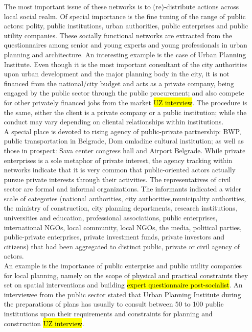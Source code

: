 \documentclass[11pt]{report}
\begin{document}
The most important issue of these networks is to (re)-distribute actions across local social realm. Of special importance is the fine tuning of the range of public actors: polity, public institutions, urban authorities, public enterprises and public utility companies.
These socially functional networks are extracted from the questionnaires among senior and young experts and young professionals in urban planning and architecture. 
An interesting example is the case of Urban Planning Institute. Even though it is the most important consultant of the city authorities upon urban development and the major planning body in the city, it is not financed from the national/city budget and acts as a private company, being engaged by the public sector through the public procurement; and also compete for other privately financed jobs from the market \hl{UZ interview}.
The procedure is the same, either the client is a private company or a public institution; while the conduct may vary depending on cliental relationships within institutions.
\\
A special place is devoted to rising agency of public-private partnership: BWP, public transportation in Belgrade, Dom omladine cultural institution; as well as those in prospect: Sava center congress hall and Airport Belgrade. 
While private enterprises is a sole metaphor of private interest, the agency tracking within networks indicate that it is very common that public-oriented actors actually pursue private interests through their activities.\footnotemark
The representatives of civil sector are formal and informal organizations. 
The informants indicated a wider scale of categories (national authorities, city authorities,municipality authorities, the ministry of construction, city planning departments, research institutions, universities and education, professional associations, public enterprises, international NGOs, local community, local NGOs, the media, political parties, public-private enterprises, private investment funds, private investors and citizens) that had been aggregated to distinct public, private or civil agency of actors.
\\
An example is the importance of public enterprise and public utility companies for local planning, namely on the scope of physical and practical constraints they set on spatial interventions and building \hl{expert questionnaire post-socialist}. An interviewee from the public sector stated that Urban Planning Institute during the preparations of plans has usually to consult between 50 to 100 public institutions upon their requirements and constraints for planning and construction \hl{UZ interview}.
\end{document}
